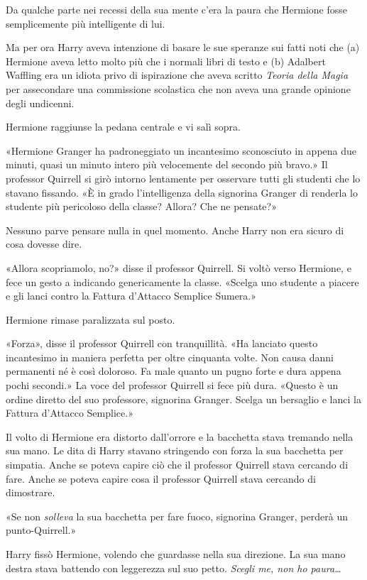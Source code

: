 Da qualche parte nei recessi della sua mente c’era la paura che Hermione fosse semplicemente più intelligente di lui.

Ma per ora Harry aveva intenzione di basare le sue speranze sui fatti noti che (a) Hermione aveva letto molto più che i normali libri di testo e (b) Adalbert Waffling era un idiota privo di ispirazione che aveva scritto \textit{Teoria della Magia} per assecondare una commissione scolastica che non aveva una grande opinione degli undicenni.

Hermione raggiunse la pedana centrale e vi salì sopra.

«Hermione Granger ha padroneggiato un incantesimo sconosciuto in appena due minuti, quasi un minuto intero più velocemente del secondo più bravo.» Il professor Quirrell si girò intorno lentamente per osservare tutti gli studenti che lo stavano fissando. «È in grado l’intelligenza della signorina Granger di renderla lo studente più pericoloso della classe? Allora? Che ne pensate?»

Nessuno parve pensare nulla in quel momento. Anche Harry non era sicuro di cosa dovesse dire.

«Allora scopriamolo, no?» disse il professor Quirrell. Si voltò verso Hermione, e fece un gesto a indicando genericamente la classe. «Scelga uno studente a piacere e gli lanci contro la Fattura d’Attacco Semplice Sumera.»

Hermione rimase paralizzata sul posto.

«Forza», disse il professor Quirrell con tranquillità. «Ha lanciato questo incantesimo in maniera perfetta per oltre cinquanta volte. Non causa danni permanenti né è così doloroso. Fa male quanto un pugno forte e dura appena pochi secondi.» La voce del professor Quirrell si fece più dura. «Questo è un ordine diretto del suo professore, signorina Granger. Scelga un bersaglio e lanci la Fattura d’Attacco Semplice.»

Il volto di Hermione era distorto dall’orrore e la bacchetta stava tremando nella sua mano. Le dita di Harry stavano stringendo con forza la sua bacchetta per simpatia. Anche se poteva capire ciò che il professor Quirrell stava cercando di fare. Anche se poteva capire cosa il professor Quirrell stava cercando di dimostrare.

«Se non \textit{solleva} la sua bacchetta per fare fuoco, signorina Granger, perderà un punto-Quirrell.»

Harry fissò Hermione, volendo che guardasse nella sua direzione. La sua mano destra stava battendo con leggerezza sul suo petto. \textit{Scegli me, non ho paura…}


